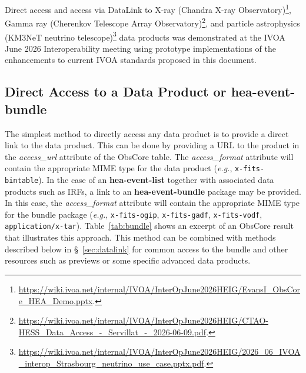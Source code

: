 Direct access and access via DataLink to X-ray (Chandra X-ray Observatory)\footnote{\url{https://wiki.ivoa.net/internal/IVOA/InterOpJune2026HEIG/EvansI_ObsCore_HEA_Demo.pptx}.}, Gamma ray (Cherenkov Telescope Array Observatory)\footnote{\url{https://wiki.ivoa.net/internal/IVOA/InterOpJune2026HEIG/CTAO-HESS_Data_Access_-_Servillat_-_2026-06-09.pdf}.}, and particle astrophysics (KM3NeT neutrino telescope)\footnote{\url{https://wiki.ivoa.net/internal/IVOA/InterOpJune2026HEIG/2026_06_IVOA_interop_Strasbourg_neutrino_use_case.pptx.pdf}.} data products was demonstrated at the IVOA June 2026 Interoperability meeting using prototype implementations of the enhancements to current IVOA standards proposed in this document.

\subsection{Direct Access to a Data Product or {\bf hea-event-bundle}}

The simplest method to directly access any data product is to provide a direct link to the data product.  This can be done by providing a URL to the product in the {\em access\_url\/} attribute of the ObsCore table. The {\em access\_format\/} attribute will contain the appropriate MIME type for the data product ({\em e.g.\/}, {\tt x-fits-bintable}).  In the case of an {\bf hea-event-list} together with associated data products such as \glspl{IRF}, a link to an {\bf hea-event-bundle} package may be provided.  In this case, the {\em access\_format \/} attribute will contain the appropriate MIME type for the bundle package ({\em e.g.\/}, {\tt x-fits-ogip}, {\tt x-fits-gadf\/}, {\tt x-fits-vodf}, {\tt application/x-tar}). Table~\ref{tab:bundle} shows an excerpt of an ObsCore result that illustrates this approach. This method  can be combined with methods described below in \S~\ref{sec:datalink} for common access to the bundle and other resources such as previews or some specific advanced data products.

